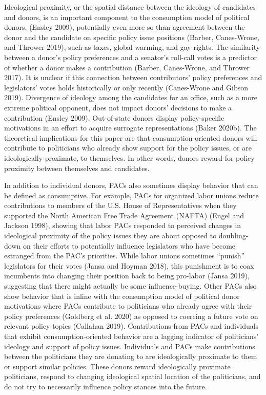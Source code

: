 \documentclass[12pt,]{article}
\begin{document}
Ideological proximity, or the spatial distance between the ideology of
candidates and donors, is an important component to the consumption
model of political donors, (Ensley 2009), potentially even more so than
agreement between the donor and the candidate on specific policy issue
positions (Barber, Canes-Wrone, and Thrower 2019), such as taxes, global
warming, and gay rights. The similarity between a donor's policy
preferences and a senator's roll-call votes is a predictor of whether a
donor makes a contribution (Barber, Canes-Wrone, and Thrower 2017). It
is unclear if this connection between contributors' policy preferences
and legislators' votes holds historically or only recently (Canes-Wrone
and Gibson 2019). Divergence of ideology among the candidates for an
office, such as a more extreme political opponent, does not impact
donors' decisions to make a contribution (Ensley 2009). Out-of-state
donors display policy-specific motivations in an effort to acquire
surrogate representations (Baker 2020b). The theoretical implications
for this paper are that consumption-oriented donors will contribute to
politicians who already show support for the policy issues, or are
ideologically proximate, to themselves. In other words, donors reward
for policy proximity between themselves and candidates.

In addition to individual donors, PACs also sometimes display behavior
that can be defined as consumptive. For example, PACs for organized
labor unions reduce contributions to members of the U.S. House of
Representatives when they supported the North American Free Trade
Agreement (NAFTA) (Engel and Jackson 1998), showing that labor PACs
responded to perceived changes in ideological proximity of the policy
issues they are about opposed to doubling-down on their efforts to
potentially influence legislators who have become estranged from the
PAC's priorities. While labor unions sometimes ``punish'' legislators
for their votes (Jansa and Hoyman 2018), this punishment is to coax
incumbents into changing their position back to being pro-labor (Jansa
2019), suggesting that there might actually be some influence-buying.
Other PACs also show behavior that is inline with the consumption model
of political donor motivations where PACs contribute to politicians who
already agree with their policy preferences (Goldberg et al. 2020) as
opposed to coercing a future vote on relevant policy topics (Callahan
2019). Contributions from PACs and individuals that exhibit
consumption-oriented behavior are a lagging indicator of politicians'
ideology and support of policy issues. Individuals and PACs make
contributions between the politicians they are donating to are
ideologically proximate to them or support similar policies. These
donors reward ideologically proximate politicians, respond to changing
ideological spatial location of the politicians, and do not try to
necessarily influence policy stances into the future.
\end{document}

